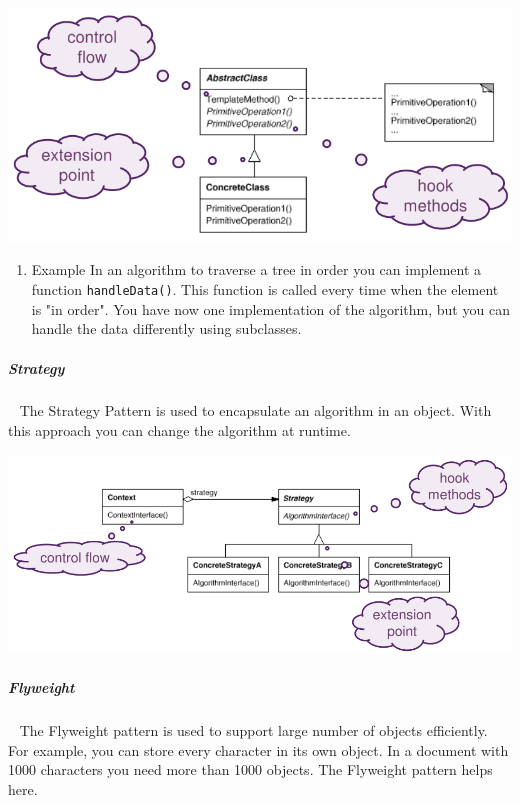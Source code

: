 \documentclass[11pt,twoside,landscape]{article}
\begin{document}
\begin{multicols}{3}
{
\begin{center}
\includegraphics[width=.9\linewidth]{img/template_method.png}
\end{center}
\label{fig:template-method-class-diagram}
}
\begin{enumerate}
\item Example
\label{sec:org2ff9094}
In an algorithm to traverse a tree in order you can implement a function \texttt{handleData()}.
This function is called every time when the element is "in order".
You have now one implementation of the algorithm, but you can handle the data differently using subclasses.
\end{enumerate}

\subparagraph{Strategy} \
\label{sec:orgc865a32}
The Strategy Pattern is used to encapsulate an algorithm in an object.
With this approach you can change the algorithm at runtime.

{
\begin{center}
\includegraphics[width=.9\linewidth]{img/strategy_pattern.png}
\end{center}
\label{fig:strategy-class-diagram}
}
\subparagraph{Flyweight} \
\label{sec:org213473b}
The Flyweight pattern is used to support large number of objects efficiently.
For example, you can store every character in its own object.
In a document with 1000 characters you need more than 1000 objects.
The Flyweight pattern helps here.


\end{multicols}
\end{document}
